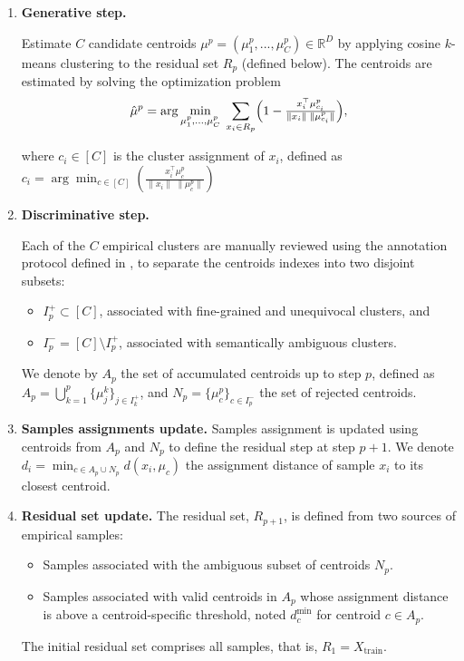         \begin{enumerate}
            \item \textbf{Generative step.} 
            
            Estimate $C$ candidate centroids $\mu^{p} = (\mu^p_1, ..., \mu^p_C) \in \mathbb{R}^D$ by applying cosine $k$-means clustering to the residual set $R_p$ (defined below). The centroids are estimated by solving the optimization problem
            \begin{equation}
                \hat{\mu}^p = \arg \min_{\mu^p_{1},\dots,\mu^p_{C}} \;
                \sum_{x_i \in R_p} \Bigl(1 - \tfrac{x_i^\top \mu^p_{c_i}}{\|x_i\|\;\|\mu^p_{c_i}\|}\Bigr),
            \label{eq:chapter_5_kmeans_objective}
            \end{equation}

            where $c_i \in [C]$ is the cluster assignment of $x_i$, defined as $c_i = \arg \min_{c \in [C]} (\tfrac{x_i^\top \mu^p_{c}}{\|x_i\|\;\|\mu^p_{c}\|})$

            \item \textbf{Discriminative step.} 
            
            Each of the $C$ empirical clusters are manually reviewed using the annotation protocol defined in , to separate the centroids indexes into two disjoint subsets: 
            
            \begin{itemize}
                \item $I_p^+ \subset [C]$, associated with fine-grained and unequivocal clusters, and 
                \item $I_p^- = [C] \setminus I_p^+$, associated with semantically ambiguous clusters. 
            \end{itemize}
            We denote by $A_p$ the set of accumulated centroids up to step $p$, defined as $A_p = \bigcup_{k=1}^p \{ \mu^k_j\}_{j\in I_k^+}$, and $N_p = \{ \mu^p_c \}_{c \in I_p^-}$ the set of rejected centroids.

            \item \textbf{Samples assignments update.} Samples assignment is updated using centroids from $A_p$ and $N_p$ to define the residual step at step $p+1$. We denote $d_i = \min_{c \in A_p \cup N_p} d(x_i, \mu_c)$ the assignment distance of sample $x_i$ to its closest centroid.

            \item \textbf{Residual set update.} The residual set, $R_{p+1}$, is defined from two sources of empirical samples: 
            \begin{itemize}
                \item Samples associated with the ambiguous subset of centroids $N_p$.
                \item Samples associated with valid centroids in $A_p$ whose assignment distance is above a centroid-specific threshold, noted $d^{\text{min}}_c$ for centroid $c \in A_p$.
            \end{itemize}
            The initial residual set comprises all samples, that is, $R_1 = X_{\text{train}}$.


\end{enumerate}
